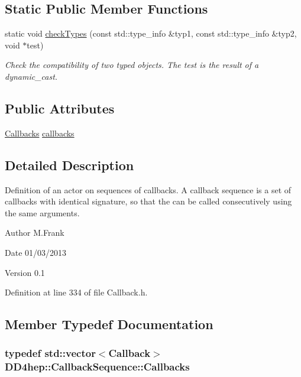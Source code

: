 \subsection*{Static Public Member Functions}
\begin{DoxyCompactItemize}
\item 
static void \hyperlink{struct_d_d4hep_1_1_callback_sequence_a79ff90bc3241fad2b0eafd5adb4dee86}{checkTypes} (const std::type\_\-info \&typ1, const std::type\_\-info \&typ2, void $\ast$test)
\begin{DoxyCompactList}\small\item\em Check the compatibility of two typed objects. The test is the result of a dynamic\_\-cast. \item\end{DoxyCompactList}\end{DoxyCompactItemize}
\subsection*{Public Attributes}
\begin{DoxyCompactItemize}
\item 
\hyperlink{struct_d_d4hep_1_1_callback_sequence_a2d9d9488b193731498c4b9cc0fdc4a6b}{Callbacks} \hyperlink{struct_d_d4hep_1_1_callback_sequence_a76c6c81bd2cd430ca45bde9206fb1839}{callbacks}
\end{DoxyCompactItemize}


\subsection{Detailed Description}
Definition of an actor on sequences of callbacks. A callback sequence is a set of callbacks with identical signature, so that the can be called consecutively using the same arguments.

\begin{DoxyAuthor}{Author}
M.Frank 
\end{DoxyAuthor}
\begin{DoxyDate}{Date}
01/03/2013 
\end{DoxyDate}
\begin{DoxyVersion}{Version}
0.1 
\end{DoxyVersion}


Definition at line 334 of file Callback.h.

\subsection{Member Typedef Documentation}
\hypertarget{struct_d_d4hep_1_1_callback_sequence_a2d9d9488b193731498c4b9cc0fdc4a6b}{
\subsubsection[{Callbacks}]{\setlength{\rightskip}{0pt plus 5cm}typedef std::vector$<${\bf Callback}$>$ {\bf DD4hep::CallbackSequence::Callbacks}}}
\label{struct_d_d4hep_1_1_callback_sequence_a2d9d9488b193731498c4b9cc0fdc4a6b}


